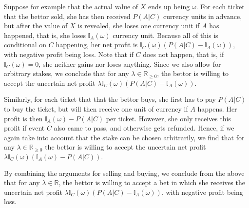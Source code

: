 \documentclass[10pt,a4paper]{paper}
\theoremstyle{definition}
\newcommand{\reals}{\mathbb{R}}
\newcommand{\realsnonneg}{\reals_{\geq 0}}
\newcommand{\ind}[1]{\mathbb{I}_{#1}}
\begin{document}

Suppose for example that the actual value of $X$ ends up being $\omega$. For each ticket that the bettor sold, she has then received $P(A\vert C)$ currency units in advance, but after the value of $X$ is revealed, she loses one currency unit if $A$ has happened, that is, she loses $\ind{A}(\omega)$ currency unit. Because all of this is conditional on $C$ happening, her net profit is $\ind{C}(\omega)(P(A\vert C) - \ind{A}(\omega))$, with negative profit being loss. Note that if $C$ does not happen, that is, if $\ind{C}(\omega)=0$, she neither gains nor loses anything. Since we also allow for arbitrary stakes, we conclude that for any $\lambda\in\realsnonneg$, the bettor is willing to accept the uncertain net profit $\lambda \ind{C}(\omega)(P(A\vert C) - \ind{A}(\omega))$.

Similarly, for each ticket that that the bettor buys, she first has to pay $P(A\vert C)$ to buy the ticket, but will then receive one unit of currency if $A$ happens. Her profit is then $\ind{A}(\omega) - P(A\vert C)$ per ticket. However, she only receives this profit if event $C$ also came to pass, and otherwise gets refunded. Hence, if we again take into account that the stake can be chosen arbitrarily, we find that for any $\lambda\in\realsnonneg$ the bettor is willing to accept the uncertain net profit $\lambda\ind{C}(\omega)(\ind{A}(\omega) - P(A\vert C))$. %

By combining the arguments for selling and buying, we conclude from the above that for any $\lambda\in\reals$, the bettor is willing to accept a bet in which she receives the uncertain net profit $\lambda\ind{C}(\omega)(P(A\vert C)-\ind{A}(\omega))$, with negative profit being loss.
\end{document}

